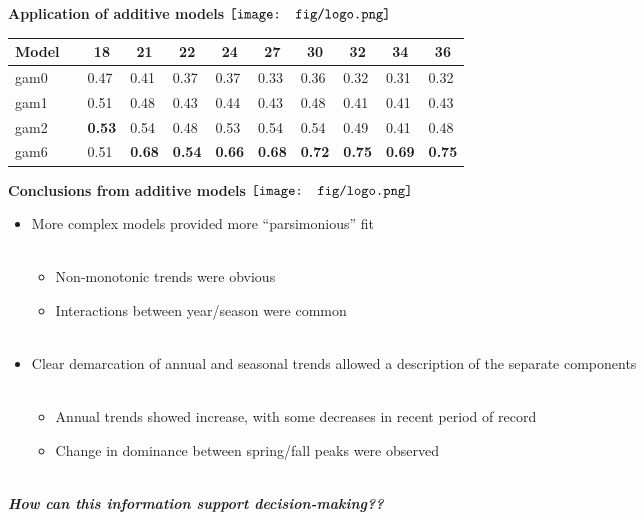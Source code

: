 \documentclass{beamer}
\newcommand{\emtxt}[1]{\textbf{\textit{{\color{mypal4} #1}}}}
\begin{document}
\begin{frame}{\textbf{Application of additive models} \hspace{0pt plus 1 filll} $\vcenter{\hbox{\texttt{[image: fig/logo.png]}}}$}
\begin{table}[!tbp]
{\begin{center}
\begin{tabular}{lclllllllll}
\multicolumn{1}{c}{Model}&\multicolumn{1}{c}{}&\multicolumn{1}{c}{18}&\multicolumn{1}{c}{21}&\multicolumn{1}{c}{22}&\multicolumn{1}{c}{24}&\multicolumn{1}{c}{27}&\multicolumn{1}{c}{30}&\multicolumn{1}{c}{32}&\multicolumn{1}{c}{34}&\multicolumn{1}{c}{36}\tabularnewline
\hline
gam0&&0.47&0.41&0.37&0.37&0.33&0.36&0.32&0.31&0.32\tabularnewline
gam1&&0.51&0.48&0.43&0.44&0.43&0.48&0.41&0.41&0.43\tabularnewline
gam2&&\textbf{\color{mypal3} 0.53}&0.54&0.48&0.53&0.54&0.54&0.49&0.41&0.48\tabularnewline
gam6&&0.51&\textbf{\color{mypal3} 0.68}&\textbf{\color{mypal3} 0.54}&\textbf{\color{mypal3} 0.66}&\textbf{\color{mypal3} 0.68}&\textbf{\color{mypal3} 0.72}&\textbf{\color{mypal3} 0.75}&\textbf{\color{mypal3} 0.69}&\textbf{\color{mypal3} 0.75}\tabularnewline
\hline
\end{tabular}\end{center}}
\end{table}\end{frame}

\begin{frame}{\textbf{Conclusions from additive models} \hspace{0pt plus 1 filll} $\vcenter{\hbox{\texttt{[image: fig/logo.png]}}}$}
\begin{itemize}
\item More complex models provided more ``parsimonious'' fit \\~\\
\begin{itemize}
\item Non-monotonic trends were obvious 
\item Interactions between year/season were common \\~\\
\end{itemize}
\item Clear demarcation of annual and seasonal trends allowed a description of the separate components \\~\\
\begin{itemize}
\item Annual trends showed increase, with some decreases in recent period of record
\item Change in dominance between spring/fall peaks were observed \\~\\
\end{itemize}
\end{itemize}
\centerline{\emtxt{How can this information support decision-making??}}
\end{frame}
\end{document}
